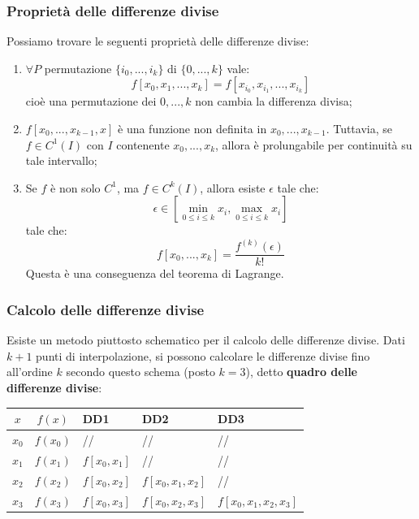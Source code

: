 \documentclass[a4paper,11pt]{article}
\begin{document}
\subsubsection{Proprietà delle differenze divise}
Possiamo trovare le seguenti proprietà delle differenze divise:
\begin{enumerate}
	\item $\forall P$ permutazione $\{i_0, ..., i_k\}$ di $\{0, ..., k \}$ vale:
		$$
			f[x_0, x_1, ..., x_k] = f[x_{i_0}, x_{i_1}, ..., x_{i_k}]
		$$
		cioè una permutazione dei $0, ..., k$ non cambia la differenza divisa;

	\item $f[x_0, ..., x_{k - 1}, x]$ è una funzione non definita in $x_0, ..., x_{k-1}$.
		Tuttavia, se $f \in C^1(I)$ con $I$ contenente $x_0, ..., x_k$, allora è prolungabile per continuità su tale intervallo;

	\item Se $f$ è non solo $C^1$, ma $f \in C^k(I)$, allora esiste $\epsilon$ tale che:
		$$
		\epsilon \in \left[ \min_{0 \leq i \leq k} x_i, \max_{0 \leq i \leq k} x_i \right]
		$$
		tale che:
		$$
		f[x_0, ..., x_k] = \frac{f^{(k)} (\epsilon) }{ k! } 
		$$ 
		Questa è una conseguenza del teorema di Lagrange.
\end{enumerate}

\subsubsection{Calcolo delle differenze divise}
Esiste un metodo piuttosto schematico per il calcolo delle differenze divise.
Dati $k + 1$ punti di interpolazione, si possono calcolare le differenze divise fino all'ordine $k$ secondo questo schema (posto $k = 3$), detto \textbf{quadro delle differenze divise}:

\begin{table}[H]
	\center 
	\begin{tabular} { c | c | p{2cm}  p{2cm} p{2cm} }
		$x$ & $f(x)$ & DD1 & DD2 & DD3 \\
		\hline
		$x_0$ & $f(x_0)$ & // & // & // \\
		$x_1$ & $f(x_1)$ & $f[x_0, x_1]$ & // & // \\
		$x_2$ & $f(x_2)$ & $f[x_0, x_2]$ & $f[x_0, x_1, x_2]$ & // \\
		$x_3$ & $f(x_3)$ & $f[x_0, x_3]$ & $f[x_0, x_2, x_3]$ & $f[x_0, x_1, x_2, x_3]$ \\
	\end{tabular}
\end{table}
\end{document}
